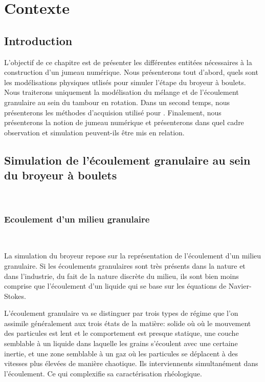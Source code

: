 
\chapter{Contexte}

\section{Introduction}

L'objectif de ce chapitre est de présenter les différentes entitées nécessaires à la construction d'un jumeau numérique. Nous présenterons tout d'abord, quels sont les modélisations physiques utlisés pour simuler l'étape du broyeur à boulets. Nous traiterons uniquement la modélisation du mélange et de l'écoulement granulaire au sein du tambour en rotation. Dans un second temps, nous présenterons les méthodes d'acquision utilisé pour . Finalement, nous présenterons la notion de jumeau numérique et présenterons dans quel cadre observation et simulation peuvent-ils être mis en relation.

\section{Simulation de l'écoulement granulaire au sein du broyeur à boulets}~\label{sec:simu_broyeur}

\subsection{Ecoulement d'un milieu granulaire}~\label{sec:simu_granulaire}

La simulation du broyeur repose sur la représentation de l'écoulement d'un milieu granulaire. Si les écoulements granulaires sont très présents dans la nature et dans l'industrie, du fait de la nature discrète du milieu, ils sont bien moins comprise que l'écoulement d'un liquide qui se base sur les équations de Navier-Stokes.

L'écoulement granulaire va se distinguer par trois types de régime que l'on assimile généralement aux trois états de la matière: solide où où le mouvement des particules est lent et le comportement est presque statique, une couche semblable à un liquide dans laquelle les grains s'écoulent avec une certaine inertie, et une zone semblable à un gaz où les particules se déplacent à des vitesses plus élevées de manière chaotique. Ils interviennents simultanément dans l'écoulement. Ce qui complexifie sa caractérisation rhéologique.

